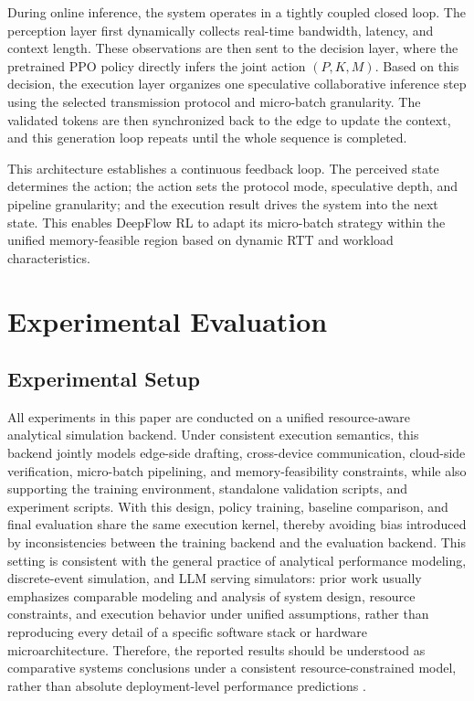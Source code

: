 \documentclass[a4paper,fleqn]{cas-dc}
\begin{document}
During online inference, the system operates in a tightly coupled closed loop. The perception layer first dynamically collects real-time bandwidth, latency, and context length. These observations are then sent to the decision layer, where the pretrained PPO policy directly infers the joint action $(P,K,M)$. Based on this decision, the execution layer organizes one speculative collaborative inference step using the selected transmission protocol and micro-batch granularity. The validated tokens are then synchronized back to the edge to update the context, and this generation loop repeats until the whole sequence is completed.

This architecture establishes a continuous feedback loop. The perceived state determines the action; the action sets the protocol mode, speculative depth, and pipeline granularity; and the execution result drives the system into the next state. This enables DeepFlow RL to adapt its micro-batch strategy within the unified memory-feasible region based on dynamic RTT and workload characteristics.


\section{Experimental Evaluation}
\subsection{Experimental Setup}

All experiments in this paper are conducted on a unified resource-aware analytical simulation backend. Under consistent execution semantics, this backend jointly models edge-side drafting, cross-device communication, cloud-side verification, micro-batch pipelining, and memory-feasibility constraints, while also supporting the training environment, standalone validation scripts, and experiment scripts. With this design, policy training, baseline comparison, and final evaluation share the same execution kernel, thereby avoiding bias introduced by inconsistencies between the training backend and the evaluation backend. This setting is consistent with the general practice of analytical performance modeling, discrete-event simulation, and LLM serving simulators: prior work usually emphasizes comparable modeling and analysis of system design, resource constraints, and execution behavior under unified assumptions, rather than reproducing every detail of a specific software stack or hardware microarchitecture. Therefore, the reported results should be understood as comparative systems conclusions under a consistent resource-constrained model, rather than absolute deployment-level performance predictions \cite{williams2009roofline,agrawal2024vidur,cho2025llmservingsim2,qin2026phantora}.
\end{document}
